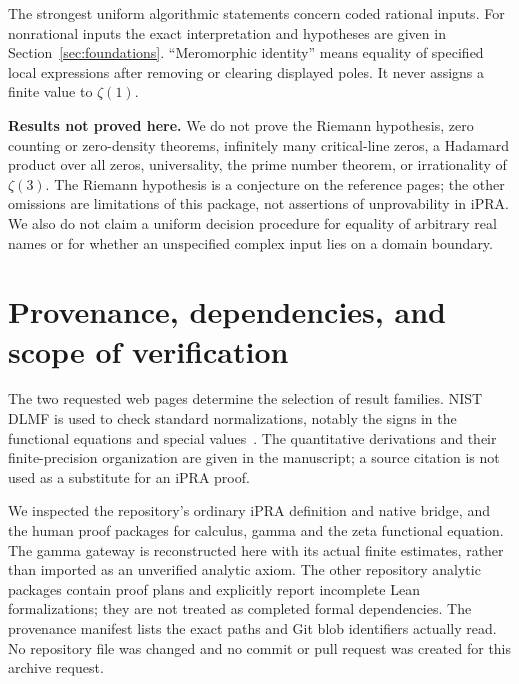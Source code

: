 \documentclass[11pt,letterpaper]{article}
\theoremstyle{definition}
\begin{document}
The strongest uniform algorithmic statements concern coded rational inputs.
For nonrational inputs the exact interpretation and hypotheses are given
in Section~\ref{sec:foundations}. ``Meromorphic identity'' means equality
of specified local expressions after removing or clearing displayed
poles. It never assigns a finite value to $\zeta(1)$.

\textbf{Results not proved here.} We do not prove the Riemann hypothesis,
zero counting or zero-density theorems, infinitely many critical-line
zeros, a Hadamard product over all zeros, universality, the prime number
theorem, or irrationality of $\zeta(3)$. The Riemann hypothesis is a
conjecture on the reference pages; the other omissions are limitations
of this package, not assertions of unprovability in iPRA. We also do not
claim a uniform decision procedure for equality of arbitrary real names
or for whether an unspecified complex input lies on a domain boundary.











\section{Provenance, dependencies, and scope of verification}
The two requested web pages determine the selection of result families.
NIST DLMF is used to check standard normalizations, notably the signs in
the functional equations and special values~\cite{DLMF25_2,DLMF25_4,DLMF25_6,DLMF25_8}.
The quantitative derivations and their finite-precision organization are
given in the manuscript; a source citation is not used as a substitute
for an iPRA proof.

We inspected the repository's ordinary iPRA definition and native bridge,
and the human proof packages for calculus, gamma and the zeta functional
equation. The gamma gateway is reconstructed here with its actual finite
estimates, rather than imported as an unverified analytic axiom.
The other repository analytic packages contain proof plans and explicitly
report incomplete Lean formalizations; they are not treated as completed
formal dependencies. The provenance manifest lists the exact paths and
Git blob identifiers actually read. No repository file was changed and
no commit or pull request was created for this archive request.
\end{document}
